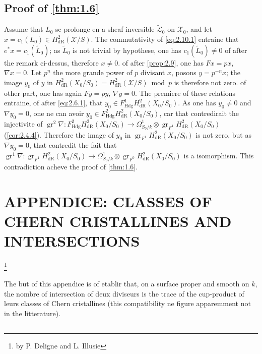\documentclass[12pt,a4paper]{article}
\theoremstyle{plain}
\theoremstyle{definition}
\theoremstyle{remark}
\DeclareMathOperator{\gr}{gr}
\newcommand{\Hdg}{\mathrm{Hdg}}
\begin{document}
\subsection{Proof of \ref{thm:1.6}}\label{subsec:2.11}

Assume that $L_0$ se prolonge en a sheaf inversible $\tilde{\mathcal{L}}_0$ on $\mathcal{X}_0$, and let $x = c_1(L_0) \in H^2_{\mathrm{dR}}(\mathcal{X}/S)$. The commutativity of \eqref{eq:2.10.1} entraine that $e^*x = c_1(\tilde{L}_0)$; as $\tilde{L}_0$ is not trivial by hypothese, one has $c_1(\tilde{L}_0) \neq 0$ of after the remark ci-dessus, therefore $x \neq 0$. of after \ref{prop:2.9}, one has $Fx = px$, $\nabla x = 0$. Let $p^n$ the more grande power of $p$ divisant $x$, posons $y = p^{-n}x$; the image $y_0$ of $y$ in $H^2_{\mathrm{dR}}(X_0/S_0) = H^2_{\mathrm{dR}}(\mathcal{X}/S) \bmod p$ is therefore not zero. of other part, one has again $Fy = py$, $\nabla y = 0$. The premiere of these relations entraine, of after \eqref{eq:2.6.1}, that $y_0 \in F^1_{\Hdg} H^2_{\mathrm{dR}}(X_0/S_0)$. As one has $y_0 \neq 0$ and $\nabla y_0 = 0$, one ne can avoir $y_0 \in F^2_{\Hdg} H^2_{\mathrm{dR}}(X_0/S_0)$, car that contredirait the injectivite of $\gr^2 \nabla: F^2_{\Hdg} H^2_{\mathrm{dR}}(X_0/S_0) \to \Omega^1_{S_0/k} \otimes \gr_{F^1} H^2_{\mathrm{dR}}(X_0/S_0)$ (\ref{cor:2.4.4}). Therefore the image of $y_0$ in $\gr_{F^1} H^2_{\mathrm{dR}}(X_0/S_0)$ is not zero, but as $\nabla y_0 = 0$, that contredit the fait that $\gr^1 \nabla: \gr_{F^1} H^2_{\mathrm{dR}}(X_0/S_0) \to \Omega^1_{S_0/k} \otimes \gr_{F^0} H^2_{\mathrm{dR}}(X_0/S_0)$ is a isomorphism. This contradiction acheve the proof of \ref{thm:1.6}.


\section{APPENDICE: CLASSES OF CHERN CRISTALLINES AND INTERSECTIONS}\label{sec:3}
\footnote{by P. Deligne and L. Illusie}

The but of this appendice is of etablir that, on a surface proper and smooth on $k$, the nombre of intersection of deux diviseurs is the trace of the cup-product of leurs classes of Chern cristallines (this compatibility ne figure apparemment not in the litterature).

\subsection{}
\end{document}
